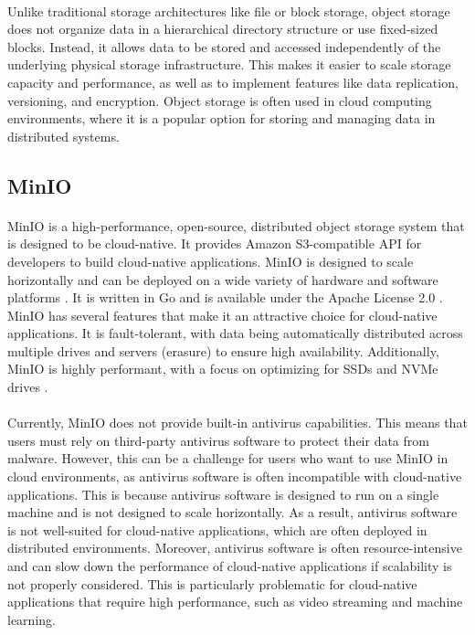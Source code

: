 \documentclass[12pt, conference, final, a4paper, onecolumn, compsoc]{IEEEtran}
\begin{document}
    \paragraph{}
    Unlike traditional storage architectures like file or block storage, object
    storage does not organize data in a hierarchical directory structure or use
    fixed-sized blocks. Instead, it allows data to be stored and accessed
    independently of the underlying physical storage infrastructure. This makes
    it easier to scale storage capacity and performance, as well as to implement
    features like data replication, versioning, and encryption. Object storage
    is often used in cloud computing environments, where it is a popular option
    for storing and managing data in distributed systems.

    \subsection*{MinIO}
    \paragraph{}
    MinIO is a high-performance, open-source, distributed object storage system
    that is designed to be cloud-native. It provides Amazon S3-compatible API
    for developers to build cloud-native applications. MinIO is designed to
    scale horizontally and can be deployed on a wide variety of hardware and
    software platforms \citep{minio}. It is written in Go and is available under
    the Apache License 2.0 \citep{minio-repo}. MinIO has several features that
    make it an attractive choice for cloud-native applications. It is
    fault-tolerant, with data being automatically distributed across multiple
    drives and servers (erasure) to ensure high availability. Additionally,
    MinIO is highly performant, with a focus on optimizing for SSDs and NVMe
    drives \citep{minio}.

    \paragraph{}
    Currently, MinIO does not provide built-in antivirus capabilities. This
    means that users must rely on third-party antivirus software to protect
    their data from malware. However, this can be a challenge for users who want
    to use MinIO in cloud environments, as antivirus software is often
    incompatible with cloud-native applications. This is because antivirus
    software is designed to run on a single machine and is not designed to scale
    horizontally. As a result, antivirus software is not well-suited for
    cloud-native applications, which are often deployed in distributed
    environments. Moreover, antivirus software is often resource-intensive and
    can slow down the performance of cloud-native applications if scalability is
    not properly considered. This is particularly problematic for cloud-native
    applications that require high performance, such as video streaming and
    machine learning.
\end{document}
